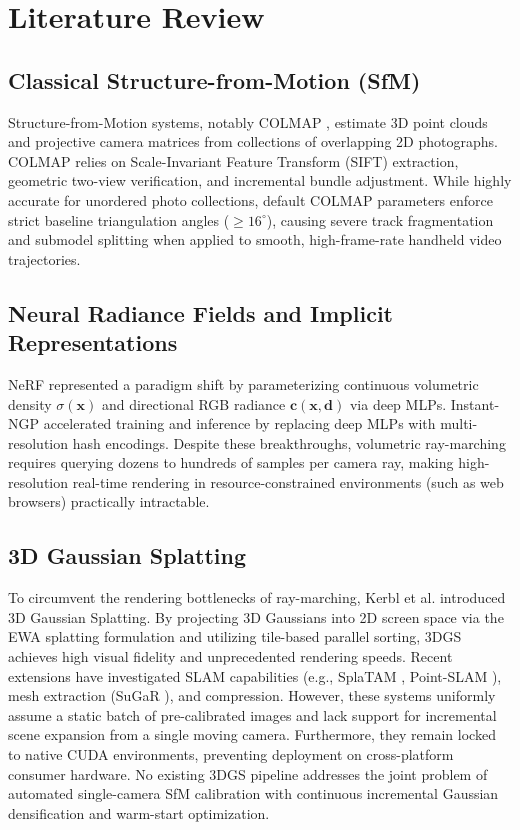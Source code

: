\documentclass[conference]{IEEEtran}
\begin{document}
\section{Literature Review}
\subsection{Classical Structure-from-Motion (SfM)}
Structure-from-Motion systems, notably COLMAP \cite{schonberger2016sfm, schonberger2016mvs}, estimate 3D point clouds and projective camera matrices from collections of overlapping 2D photographs. COLMAP relies on Scale-Invariant Feature Transform (SIFT) extraction, geometric two-view verification, and incremental bundle adjustment. While highly accurate for unordered photo collections, default COLMAP parameters enforce strict baseline triangulation angles ($\ge 16^\circ$), causing severe track fragmentation and submodel splitting when applied to smooth, high-frame-rate handheld video trajectories.

\subsection{Neural Radiance Fields and Implicit Representations}
NeRF \cite{mildenhall2020nerf} represented a paradigm shift by parameterizing continuous volumetric density $\sigma(\mathbf{x})$ and directional RGB radiance $\mathbf{c}(\mathbf{x}, \mathbf{d})$ via deep MLPs. Instant-NGP \cite{muller2022instant} accelerated training and inference by replacing deep MLPs with multi-resolution hash encodings. Despite these breakthroughs, volumetric ray-marching requires querying dozens to hundreds of samples per camera ray, making high-resolution real-time rendering in resource-constrained environments (such as web browsers) practically intractable.

\subsection{3D Gaussian Splatting}
To circumvent the rendering bottlenecks of ray-marching, Kerbl et al. \cite{kerbl20233d} introduced 3D Gaussian Splatting. By projecting 3D Gaussians into 2D screen space via the EWA splatting formulation \cite{zwicker2001ewa} and utilizing tile-based parallel sorting, 3DGS achieves high visual fidelity and unprecedented rendering speeds. Recent extensions have investigated SLAM capabilities (e.g., SplaTAM \cite{keetha2024splatam}, Point-SLAM \cite{sandstrom2023pointslam}), mesh extraction (SuGaR \cite{guedon2024sugar}), and compression. However, these systems uniformly assume a static batch of pre-calibrated images and lack support for incremental scene expansion from a single moving camera. Furthermore, they remain locked to native CUDA environments, preventing deployment on cross-platform consumer hardware. No existing 3DGS pipeline addresses the joint problem of automated single-camera SfM calibration with continuous incremental Gaussian densification and warm-start optimization.
\end{document}
